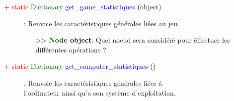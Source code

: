 \documentclass[a4paper, 11pt]{article}
\begin{document}
	\begin{description}
		\item [+ \textcolor{red}{static} \textcolor{darkgreen}{Dictionary} \textcolor{blue}
		{get\_game\_statistiques} (object)]: Renvoie les caractéristiques générales liées au jeu.
		\begin{itemize}
			\item [>> \textbf{\textcolor{darkgreen}{Node} object}:] Quel noeud sera considéré pour éffectuer 
			les différentes opérations ?\\
		\end{itemize}
	\end{description}
	\begin{description}
		\item [+ \textcolor{red}{static} \textcolor{darkgreen}{Dictionary} \textcolor{blue}
		{get\_computer\_statistiques} ()]: Renvoie les caractéristiques générales liées à \\l'ordinateur
		ainsi qu'a son système d'exploitation.\\
	\end{description}
\end{document}
